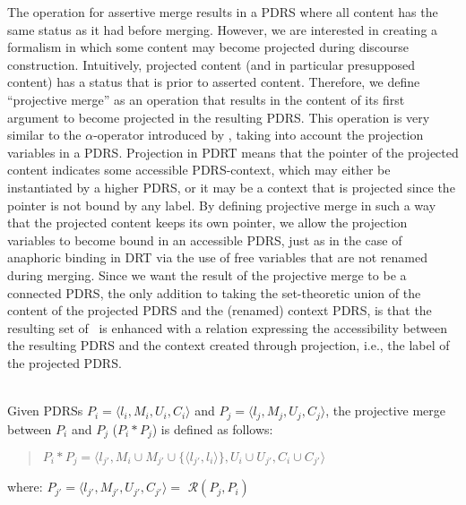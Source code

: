 \noindent The operation for assertive merge results in a PDRS where all
content has the same status as it had before merging. However, we are
interested in creating a formalism in which some content may become
projected during discourse construction.  Intuitively, projected content
(and in particular presupposed content) has a status that is prior to
asserted content.  Therefore, we define ``projective merge'' as an operation
that results in the content of its first argument to become projected in the
resulting PDRS.  This operation is very similar to the $\alpha$-operator
introduced by \cite{bos2003implementing}, taking into account the projection
variables in a PDRS. Projection in PDRT means that the pointer of the
projected content indicates some accessible PDRS-context, which may either
be instantiated by a higher PDRS, or it may be a context that is projected
since the pointer is not bound by any label. By defining projective merge in
such a way that the projected content keeps its own pointer, we allow the
projection variables to become bound in an accessible PDRS, just as in the
case of anaphoric binding in DRT via the use of free variables that are not
renamed during merging. Since we want the result of the projective merge to
be a connected PDRS, the only addition to taking the set-theoretic union of
the content of the projected PDRS and the (renamed) context PDRS, is that
the resulting set of \MAPs~is enhanced with a relation expressing the
accessibility between the resulting PDRS and the context created through
projection, i.e., the label of the projected PDRS.

\begin{definition}\label{def:pmerge}~\\
Given PDRSs $P_i=\langle l_i,M_i,U_i,C_i \rangle$ and 
$P_j=\langle l_j,M_j,U_j,C_j\rangle$, the projective merge between $P_i$
and $P_j$ ($P_i \ast P_j$) is defined as follows:
  \begin{quote}
    $P_i \ast P_j = 
      \langle l_{j'}, 
        M_{i}\cup M_{j'}\cup\{\langle l_{j'},l_{i}\rangle\}, 
        U_{i}\cup U_{j'},C_{i} \cup C_{j'}\rangle$
  \end{quote}
  where: $P_{j'} = \langle l_{j'}, M_{j'}, U_{j'}, C_{j'} \rangle =$ 
      $\mathcal{R}(P_j,P_i)$
\end{definition}

